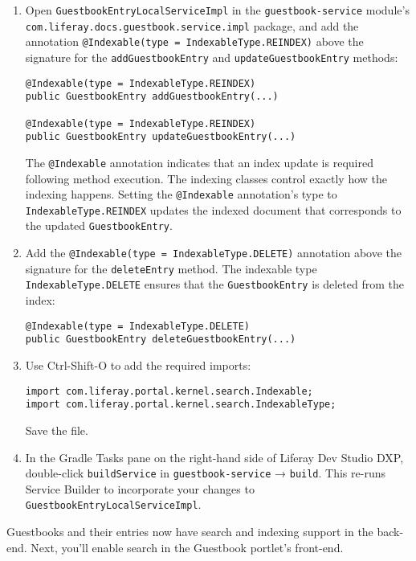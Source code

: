 \begin{enumerate}
\def\labelenumi{\arabic{enumi}.}
\item
  Open \texttt{GuestbookEntryLocalServiceImpl} in the
  \texttt{guestbook-service} module's
  \texttt{com.liferay.docs.guestbook.service.impl} package, and add the
  annotation \texttt{@Indexable(type\ =\ IndexableType.REINDEX)} above
  the signature for the \texttt{addGuestbookEntry} and
  \texttt{updateGuestbookEntry} methods:

\begin{verbatim}
@Indexable(type = IndexableType.REINDEX)
public GuestbookEntry addGuestbookEntry(...)

@Indexable(type = IndexableType.REINDEX)
public GuestbookEntry updateGuestbookEntry(...)
\end{verbatim}

  The \texttt{@Indexable} annotation indicates that an index update is
  required following method execution. The indexing classes control
  exactly how the indexing happens. Setting the \texttt{@Indexable}
  annotation's type to \texttt{IndexableType.REINDEX} updates the
  indexed document that corresponds to the updated
  \texttt{GuestbookEntry}.
\item
  Add the \texttt{@Indexable(type\ =\ IndexableType.DELETE)} annotation
  above the signature for the \texttt{deleteEntry} method. The indexable
  type \texttt{IndexableType.DELETE} ensures that the
  \texttt{GuestbookEntry} is deleted from the index:

\begin{verbatim}
@Indexable(type = IndexableType.DELETE)
public GuestbookEntry deleteGuestbookEntry(...)
\end{verbatim}
\item
  Use Ctrl-Shift-O to add the required imports:

\begin{verbatim}
import com.liferay.portal.kernel.search.Indexable;
import com.liferay.portal.kernel.search.IndexableType;
\end{verbatim}

  Save the file.
\item
  In the Gradle Tasks pane on the right-hand side of Liferay Dev Studio
  DXP, double-click \texttt{buildService} in \texttt{guestbook-service}
  → \texttt{build}. This re-runs Service Builder to incorporate your
  changes to \texttt{GuestbookEntryLocalServiceImpl}.
\end{enumerate}

Guestbooks and their entries now have search and indexing support in the
back-end. Next, you'll enable search in the Guestbook portlet's
front-end.

